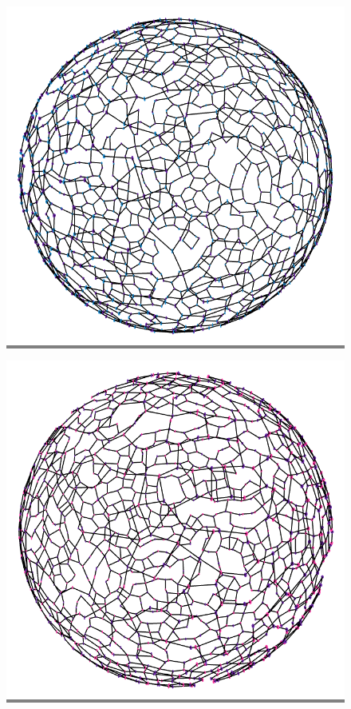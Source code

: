 \documentclass{article}
\begin{document}
\begin{figure}
\begin{minipage}{0.3\textwidth}
    \end{minipage}
    \hspace{\fill}
    \begin{minipage}{0.3\textwidth}
    \colorbox{gray}{\includegraphics[width=\linewidth]{./images/sphere_1_bb_0.png}}
    \end{minipage}
    \hspace{\fill}
    \begin{minipage}{0.3\textwidth}
    \colorbox{gray}{\includegraphics[width=\linewidth]{./images/sphere_1_bb_1.png}}

\end{minipage}
\end{figure}
\end{document}
